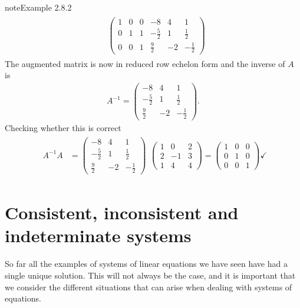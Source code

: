 \documentclass[letterpaper,10pt,english]{jupyterBook}
\begin{document}
\begin{sphinxadmonition}{note}{Example 2.8.2}
\begin{equation*}
\begin{split}
\begin{align*}
    &\left( \begin{array}{ccc|ccc}
      1 & 0 & 0 & -8 & 4 & 1 \\
      0 & 1 & 1 & -\frac{5}{2} & 1 & \frac{1}{2} \\
      0 & 0 & 1 & \frac{9}{2} & -2 & -\frac{1}{2}
    \end{array} \right)  
\end{align*} \end{split}
\end{equation*}
\sphinxAtStartPar
The augmented matrix is now in reduced row echelon form and the inverse of \(A\) is
\begin{equation*}
\begin{split} A^{-1} =
\begin{pmatrix} -8 & 4 & 1 \\ -\frac{5}{2} & 1 & \frac{1}{2} \\ \frac{9}{2} & -2 & -\frac{1}{2} \end{pmatrix}. \end{split}
\end{equation*}
\sphinxAtStartPar
Checking whether this is correct
\begin{equation*}
\begin{split} \begin{align*}
  A^{-1} A &=
  \begin{pmatrix}
    -8 & 4 & 1 \\
    -\frac{5}{2} & 1 & \frac{1}{2} \\
    \frac{9}{2} & -2 & -\frac{1}{2} \end{pmatrix}
  \end{align*}
  \begin{pmatrix}
    1 & 0 & 2 \\
    2 & -1 & 3 \\
    1 & 4 & 4
  \end{pmatrix} =
  \begin{pmatrix}
    1 & 0 & 0 \\
    0 & 1 & 0 \\
    0 & 0 & 1
  \end{pmatrix} \checkmark\end{split}
\end{equation*}\end{sphinxadmonition}

\sphinxstepscope


\section{Consistent, inconsistent and indeterminate systems}
\label{\detokenize{_pages/2.6_Consistent_systems:consistent-inconsistent-and-indeterminate-systems}}\label{\detokenize{_pages/2.6_Consistent_systems:consistent-inconsistent-and-indeterminate-systems-section}}\label{\detokenize{_pages/2.6_Consistent_systems::doc}}
\sphinxAtStartPar
So far all the examples of systems of linear equations we have seen have had a single unique solution. This will not always be the case, and it is important that we consider the different situations that can arise when dealing with systems of equations.
\end{document}

